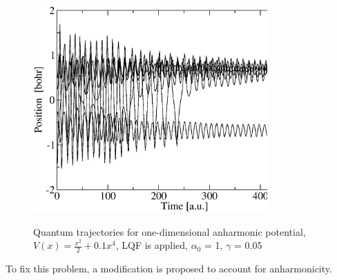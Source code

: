 \documentclass[11pt]{revtex4}
\begin{document}
\begin{figure}
	\includegraphics[width=0.8\textwidth]{figs/traj} \label{fig:lqf}
	\caption{Quantum trajectories for one-dimensional anharmonic potential, $V(x) = \frac{x^2}{2}+0.1x^4$, LQF is applied, $\alpha_0$ = 1, $\gamma$ = 0.05}
\end{figure}    

To fix this problem, a modification is proposed to account for anharmonicity. 


%
 
\end{document}
